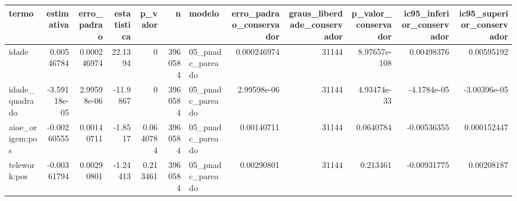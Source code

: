\begin{tabular}{lrrrrrlrrrrr}
\toprule
termo & estimativa & erro\_padrao & estatistica & p\_valor & n & modelo & erro\_padrao\_conservador & graus\_liberdade\_conservador & p\_valor\_conservador & ic95\_inferior\_conservador & ic95\_superior\_conservador \\
\midrule
idade & 0.00546784 & 0.000246974 & 22.1394 & 0 & 3960584 & 05\_pnadc\_pareado & 0.000246974 & 31144 & 8.97657e-108 & 0.00498376 & 0.00595192 \\
idade\_quadrado & -3.59118e-05 & 2.99598e-06 & -11.9867 & 0 & 3960584 & 05\_pnadc\_pareado & 2.99598e-06 & 31144 & 4.93474e-33 & -4.1784e-05 & -3.00396e-05 \\
aioe\_origem:pos & -0.00260555 & 0.00140711 & -1.8517 & 0.0640784 & 3960584 & 05\_pnadc\_pareado & 0.00140711 & 31144 & 0.0640784 & -0.00536355 & 0.000152447 \\
telework:pos & -0.00361794 & 0.00290801 & -1.24413 & 0.213461 & 3960584 & 05\_pnadc\_pareado & 0.00290801 & 31144 & 0.213461 & -0.00931775 & 0.00208187 \\
\bottomrule
\end{tabular}
